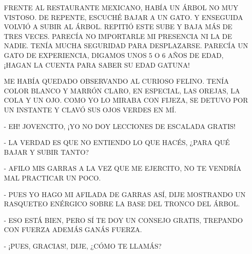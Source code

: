 \newpage
{}
\begin{minipage}{.5\textwidth}
	FRENTE AL RESTAURANTE MEXICANO, HABÍA UN ÁRBOL NO MUY VISTOSO. DE REPENTE, ESCUCHÉ BAJAR A UN GATO. Y ENSEGUIDA VOLVIÓ A SUBIR AL ÁRBOL. REPITIÓ ESTE SUBE Y BAJA MÁS DE TRES VECES. PARECÍA NO IMPORTARLE MI PRESENCIA NI LA DE NADIE. TENÍA MUCHA SEGURIDAD PARA DESPLAZARSE. PARECÍA UN GATO DE EXPERIENCIA, DIGAMOS UNOS 5 O 6 AÑOS DE EDAD, ¡HAGAN LA CUENTA PARA SABER SU EDAD GATUNA! 
\end{minipage}
\newpage
{}	
ME HABÍA QUEDADO OBSERVANDO AL CURIOSO FELINO. TENÍA COLOR BLANCO Y MARRÓN CLARO, EN ESPECIAL, LAS OREJAS, LA COLA Y UN OJO. COMO YO LO MIRABA CON FIJEZA, SE DETUVO POR UN INSTANTE Y CLAVÓ SUS OJOS VERDES EN MÍ.

- EH! JOVENCITO, ¡YO NO DOY LECCIONES DE ESCALADA GRATIS! 

- LA VERDAD ES QUE NO ENTIENDO LO QUE HACÉS, ¿PARA QUÉ BAJAR Y SUBIR TANTO?

- AFILO MIS GARRAS A LA VEZ QUE ME EJERCITO, NO TE VENDRÍA MAL PRACTICAR UN POCO.

- PUES YO HAGO MI AFILADA DE GARRAS ASÍ, DIJE MOSTRANDO UN RASQUETEO ENÉRGICO SOBRE LA BASE DEL TRONCO DEL ÁRBOL.

- ESO ESTÁ BIEN, PERO SÍ TE DOY UN CONSEJO GRATIS, TREPANDO CON FUERZA ADEMÁS GANÁS FUERZA.

- ¡PUES, GRACIAS!, DIJE, ¿CÓMO TE LLAMÁS?

